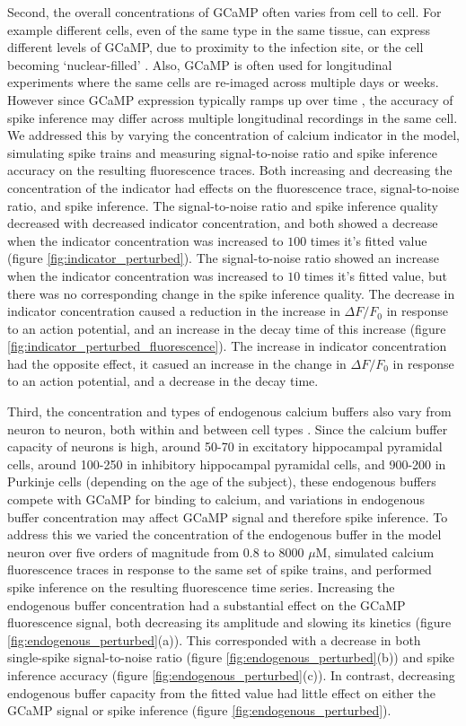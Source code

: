 Second, the overall concentrations of GCaMP often varies from cell to cell. For example different cells, even of the same type in the same tissue, can express different levels of GCaMP, due to proximity to the infection site, or the cell becoming `nuclear-filled' \parencite{tian, chen}. Also, GCaMP is often used for longitudinal experiments where the same cells are re-imaged across multiple days or weeks. However since GCaMP expression typically ramps up over time  \parencite{chen}, the accuracy of spike inference may differ across multiple longitudinal recordings in the same cell. We addressed this by varying the concentration of calcium indicator in the model, simulating spike trains and measuring signal-to-noise ratio and spike inference accuracy on the resulting fluorescence traces. Both increasing and decreasing the concentration of the indicator had effects on the fluorescence trace, signal-to-noise ratio, and spike inference. The signal-to-noise ratio and spike inference quality decreased with decreased indicator concentration, and both showed a decrease when the indicator concentration was increased to $100$ times it's fitted value (figure \ref{fig:indicator_perturbed}). The signal-to-noise ratio showed an increase when the indicator concentration was increased to $10$ times it's fitted value, but there was no corresponding change in the spike inference quality. The decrease in indicator concentration caused a reduction in the increase in $\Delta F/F_0$ in response to an action potential, and an increase in the decay time of this increase (figure \ref{fig:indicator_perturbed_fluorescence}). The increase in indicator concentration had the opposite effect, it casued an increase in the change in $\Delta F/F_0$ in response to an action potential, and a decrease in the decay time.

Third, the concentration and types of endogenous calcium buffers also vary from neuron to neuron, both within and between cell types \parencite{bartol, maravall, neher}. Since the calcium buffer capacity of neurons is high, around 50-70 \parencite{lee} in excitatory hippocampal pyramidal cells, around 100-250 \parencite{lee} in inhibitory hippocampal pyramidal cells, and 900-200 in Purkinje cells (depending on the age of the subject), these endogenous buffers compete with GCaMP for binding to calcium, and variations in endogenous buffer concentration may affect GCaMP signal and therefore spike inference. To address this we varied the concentration of the endogenous buffer in the model neuron over five orders of magnitude from $0.8$ to $8000$ $\mu$M, simulated calcium fluorescence traces in response to the same set of spike trains, and performed spike inference on the resulting fluorescence time series. Increasing the endogenous buffer concentration had a substantial effect on the GCaMP fluorescence signal, both decreasing its amplitude and slowing its kinetics (figure \ref{fig:endogenous_perturbed}(a)). This corresponded with a decrease in both single-spike signal-to-noise ratio (figure \ref{fig:endogenous_perturbed}(b)) and spike inference accuracy (figure \ref{fig:endogenous_perturbed}(c)). In contrast, decreasing endogenous buffer capacity from the fitted value had little effect on either the GCaMP signal or spike inference (figure \ref{fig:endogenous_perturbed}).


